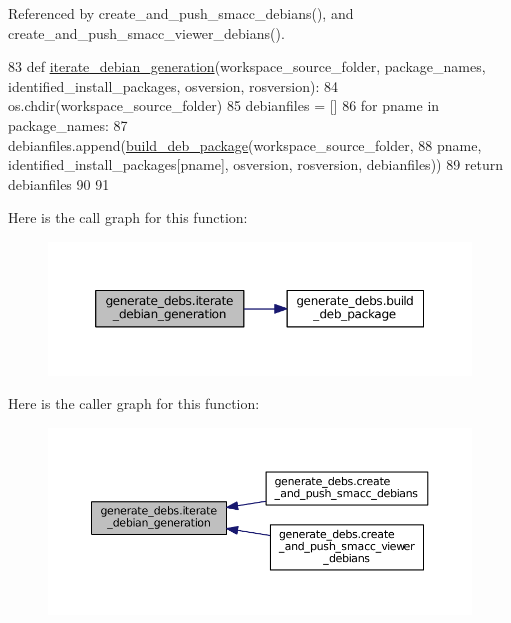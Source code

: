 Referenced by create\+\_\+and\+\_\+push\+\_\+smacc\+\_\+debians(), and create\+\_\+and\+\_\+push\+\_\+smacc\+\_\+viewer\+\_\+debians().


\begin{DoxyCode}
83 \textcolor{keyword}{def }\hyperlink{namespacegenerate__debs_a2615a6fc7860b6aa9e920e6b4d886589}{iterate\_debian\_generation}(workspace\_source\_folder, package\_names, 
      identified\_install\_packages, osversion, rosversion):
84     os.chdir(workspace\_source\_folder)
85     debianfiles = []
86     \textcolor{keywordflow}{for} pname \textcolor{keywordflow}{in} package\_names:
87         debianfiles.append(\hyperlink{namespacegenerate__debs_aa70c3f4917ddc57b13eaed8501f571a8}{build\_deb\_package}(workspace\_source\_folder,
88                                              pname, identified\_install\_packages[pname], osversion, 
      rosversion, debianfiles))
89     \textcolor{keywordflow}{return} debianfiles
90 
91 
\end{DoxyCode}


Here is the call graph for this function\+:
\nopagebreak
\begin{figure}[H]
\begin{center}
\leavevmode
\includegraphics[width=350pt]{namespacegenerate__debs_a2615a6fc7860b6aa9e920e6b4d886589_cgraph}
\end{center}
\end{figure}




Here is the caller graph for this function\+:
\nopagebreak
\begin{figure}[H]
\begin{center}
\leavevmode
\includegraphics[width=350pt]{namespacegenerate__debs_a2615a6fc7860b6aa9e920e6b4d886589_icgraph}
\end{center}
\end{figure}



